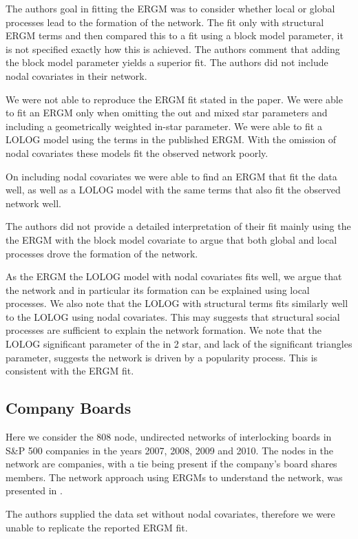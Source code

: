 \documentclass[
]{statsoc}
\begin{document}
The authors goal in fitting the ERGM was to consider whether local or
global processes lead to the formation of the network. The fit only with
structural ERGM terms and then compared this to a fit using a block
model parameter, it is not specified exactly how this is achieved. The
authors comment that adding the block model parameter yields a superior
fit. The authors did not include nodal covariates in their network.

We were not able to reproduce the ERGM fit stated in the paper. We were
able to fit an ERGM only when omitting the out and mixed star parameters
and including a geometrically weighted in-star parameter. We were able
to fit a LOLOG model using the terms in the published ERGM. With the
omission of nodal covariates these models fit the observed network
poorly.

On including nodal covariates we were able to find an ERGM that fit the
data well, as well as a LOLOG model with the same terms that also fit
the observed network well.

The authors did not provide a detailed interpretation of their fit
mainly using the the ERGM with the block model covariate to argue that
both global and local processes drove the formation of the network.

As the ERGM the LOLOG model with nodal covariates fits well, we argue
that the network and in particular its formation can be explained using
local processes. We also note that the LOLOG with structural terms fits
similarly well to the LOLOG using nodal covariates. This may suggests
that structural social processes are sufficient to explain the network
formation. We note that the LOLOG significant parameter of the in 2
star, and lack of the significant triangles parameter, suggests the
network is driven by a popularity process. This is consistent with the
ERGM fit.

\subsection{Company Boards}

Here we consider the 808 node, undirected networks of interlocking
boards in S\&P 500 companies in the years 2007, 2008, 2009 and 2010. The
nodes in the network are companies, with a tie being present if the
company's board shares members. The network approach using ERGMs to
understand the network, was presented in \cite{Gygax2015}.

The authors supplied the data set without nodal covariates, therefore we
were unable to replicate the reported ERGM fit.
\end{document}
